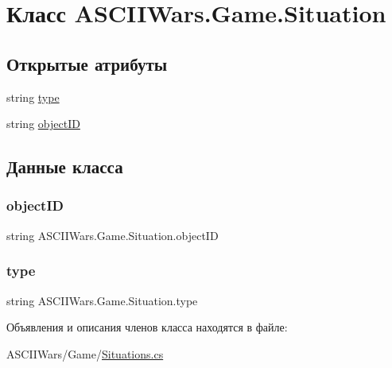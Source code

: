 \hypertarget{class_a_s_c_i_i_wars_1_1_game_1_1_situation}{}\section{Класс A\+S\+C\+I\+I\+Wars.\+Game.\+Situation}
\label{class_a_s_c_i_i_wars_1_1_game_1_1_situation}
\subsection*{Открытые атрибуты}
\begin{DoxyCompactItemize}
\item 
string \hyperlink{class_a_s_c_i_i_wars_1_1_game_1_1_situation_aefc60f917d443f47bdec48d9c45af5df}{type}
\item 
string \hyperlink{class_a_s_c_i_i_wars_1_1_game_1_1_situation_a84a39566fb7d8b3efa59e990597ac039}{object\+ID}
\end{DoxyCompactItemize}


\subsection{Данные класса}
\hypertarget{class_a_s_c_i_i_wars_1_1_game_1_1_situation_a84a39566fb7d8b3efa59e990597ac039}{}\label{class_a_s_c_i_i_wars_1_1_game_1_1_situation_a84a39566fb7d8b3efa59e990597ac039} 
\subsubsection{\texorpdfstring{object\+ID}{objectID}}
{\footnotesize\ttfamily string A\+S\+C\+I\+I\+Wars.\+Game.\+Situation.\+object\+ID}

\hypertarget{class_a_s_c_i_i_wars_1_1_game_1_1_situation_aefc60f917d443f47bdec48d9c45af5df}{}\label{class_a_s_c_i_i_wars_1_1_game_1_1_situation_aefc60f917d443f47bdec48d9c45af5df} 
\subsubsection{\texorpdfstring{type}{type}}
{\footnotesize\ttfamily string A\+S\+C\+I\+I\+Wars.\+Game.\+Situation.\+type}



Объявления и описания членов класса находятся в файле\+:\begin{DoxyCompactItemize}
\item 
A\+S\+C\+I\+I\+Wars/\+Game/\hyperlink{_situations_8cs}{Situations.\+cs}\end{DoxyCompactItemize}

